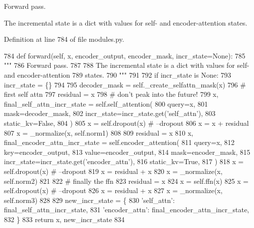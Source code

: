 \begin{DoxyVerb}Forward pass.

The incremental state is a dict with values for self- and encoder-attention
states.
\end{DoxyVerb}
 

Definition at line 784 of file modules.\+py.


\begin{DoxyCode}
784     \textcolor{keyword}{def }forward(self, x, encoder\_output, encoder\_mask, incr\_state=None):
785         \textcolor{stringliteral}{"""}
786 \textcolor{stringliteral}{        Forward pass.}
787 \textcolor{stringliteral}{}
788 \textcolor{stringliteral}{        The incremental state is a dict with values for self- and encoder-attention}
789 \textcolor{stringliteral}{        states.}
790 \textcolor{stringliteral}{        """}
791 
792         \textcolor{keywordflow}{if} incr\_state \textcolor{keywordflow}{is} \textcolor{keywordtype}{None}:
793             incr\_state = \{\}
794 
795         decoder\_mask = self.\_create\_selfattn\_mask(x)
796         \textcolor{comment}{# first self attn}
797         residual = x
798         \textcolor{comment}{# don't peak into the future!}
799         x, final\_self\_attn\_incr\_state = self.self\_attention(
800             query=x,
801             mask=decoder\_mask,
802             incr\_state=incr\_state.get(\textcolor{stringliteral}{'self\_attn'}),
803             static\_kv=\textcolor{keyword}{False},
804         )
805         x = self.dropout(x)  \textcolor{comment}{# --dropout}
806         x = x + residual
807         x = \_normalize(x, self.norm1)
808 
809         residual = x
810         x, final\_encoder\_attn\_incr\_state = self.encoder\_attention(
811             query=x,
812             key=encoder\_output,
813             value=encoder\_output,
814             mask=encoder\_mask,
815             incr\_state=incr\_state.get(\textcolor{stringliteral}{'encoder\_attn'}),
816             static\_kv=\textcolor{keyword}{True},
817         )
818         x = self.dropout(x)  \textcolor{comment}{# --dropout}
819         x = residual + x
820         x = \_normalize(x, self.norm2)
821 
822         \textcolor{comment}{# finally the ffn}
823         residual = x
824         x = self.ffn(x)
825         x = self.dropout(x)  \textcolor{comment}{# --dropout}
826         x = residual + x
827         x = \_normalize(x, self.norm3)
828 
829         new\_incr\_state = \{
830             \textcolor{stringliteral}{'self\_attn'}: final\_self\_attn\_incr\_state,
831             \textcolor{stringliteral}{'encoder\_attn'}: final\_encoder\_attn\_incr\_state,
832         \}
833         \textcolor{keywordflow}{return} x, new\_incr\_state
834 
\end{DoxyCode}
